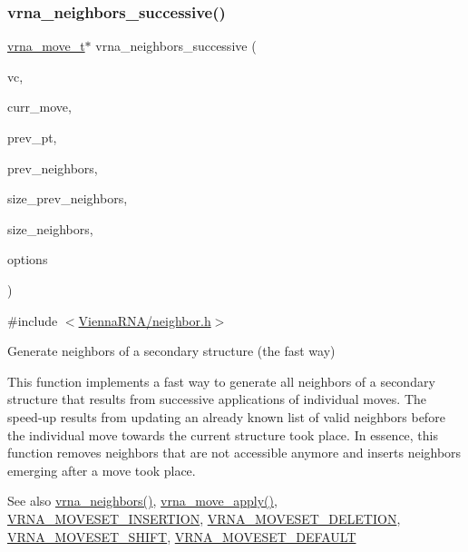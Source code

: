 \subsubsection{\texorpdfstring{vrna\+\_\+neighbors\+\_\+successive()}{vrna\_neighbors\_successive()}}
{\footnotesize\ttfamily \hyperlink{group__neighbors_structvrna__move__s}{vrna\+\_\+move\+\_\+t}$\ast$ vrna\+\_\+neighbors\+\_\+successive (\begin{DoxyParamCaption}\item[{const \hyperlink{group__fold__compound_ga1b0cef17fd40466cef5968eaeeff6166}{vrna\+\_\+fold\+\_\+compound\+\_\+t} $\ast$}]{vc,  }\item[{const \hyperlink{group__neighbors_structvrna__move__s}{vrna\+\_\+move\+\_\+t} $\ast$}]{curr\+\_\+move,  }\item[{const short $\ast$}]{prev\+\_\+pt,  }\item[{const \hyperlink{group__neighbors_structvrna__move__s}{vrna\+\_\+move\+\_\+t} $\ast$}]{prev\+\_\+neighbors,  }\item[{int}]{size\+\_\+prev\+\_\+neighbors,  }\item[{int $\ast$}]{size\+\_\+neighbors,  }\item[{unsigned int}]{options }\end{DoxyParamCaption})}



{\ttfamily \#include $<$\hyperlink{neighbor_8h}{Vienna\+R\+N\+A/neighbor.\+h}$>$}



Generate neighbors of a secondary structure (the fast way) 

This function implements a fast way to generate all neighbors of a secondary structure that results from successive applications of individual moves. The speed-\/up results from updating an already known list of valid neighbors before the individual move towards the current structure took place. In essence, this function removes neighbors that are not accessible anymore and inserts neighbors emerging after a move took place.

\begin{DoxySeeAlso}{See also}
\hyperlink{group__neighbors_ga249544953933c64a6a5a20b33e3d3bc9}{vrna\+\_\+neighbors()}, \hyperlink{group__neighbors_gacdbc5f609b46aeb07d2c7e015677a1e0}{vrna\+\_\+move\+\_\+apply()}, \hyperlink{group__neighbors_gaf39028db9c70d3be528929182a3f2d5a}{V\+R\+N\+A\+\_\+\+M\+O\+V\+E\+S\+E\+T\+\_\+\+I\+N\+S\+E\+R\+T\+I\+ON}, \hyperlink{group__neighbors_gac05db9392c6647e3e9a6982096c5b384}{V\+R\+N\+A\+\_\+\+M\+O\+V\+E\+S\+E\+T\+\_\+\+D\+E\+L\+E\+T\+I\+ON}, \hyperlink{group__neighbors_ga68ea27c81de4b74e48b775c04052590b}{V\+R\+N\+A\+\_\+\+M\+O\+V\+E\+S\+E\+T\+\_\+\+S\+H\+I\+FT}, \hyperlink{group__neighbors_gaa5ffec4dd0d02df320f123e6888154d1}{V\+R\+N\+A\+\_\+\+M\+O\+V\+E\+S\+E\+T\+\_\+\+D\+E\+F\+A\+U\+LT}
\end{DoxySeeAlso}


